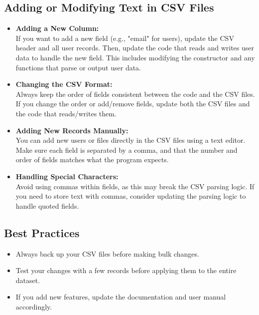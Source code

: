 \documentclass[a4paper,12pt]{article}
\begin{document}
\subsection{Adding or Modifying Text in CSV Files}
\begin{itemize}
    \item \textbf{Adding a New Column:} \\
    If you want to add a new field (e.g., "email" for users), update the CSV header and all user records. Then, update the code that reads and writes user data to handle the new field. This includes modifying the constructor and any functions that parse or output user data.
    \item \textbf{Changing the CSV Format:} \\
    Always keep the order of fields consistent between the code and the CSV files. If you change the order or add/remove fields, update both the CSV files and the code that reads/writes them.
    \item \textbf{Adding New Records Manually:} \\
    You can add new users or files directly in the CSV files using a text editor. Make sure each field is separated by a comma, and that the number and order of fields matches what the program expects.
    \item \textbf{Handling Special Characters:} \\
    Avoid using commas within fields, as this may break the CSV parsing logic. If you need to store text with commas, consider updating the parsing logic to handle quoted fields.
\end{itemize}

\subsection{Best Practices}
\begin{itemize}
    \item Always back up your CSV files before making bulk changes.
    \item Test your changes with a few records before applying them to the entire dataset.
    \item If you add new features, update the documentation and user manual accordingly.
\end{itemize}

\nocite{*}
\printbibliography
\end{document}
